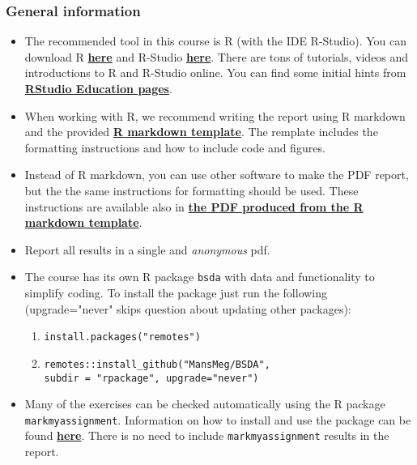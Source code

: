 
\subsubsection*{General information}


\begin{itemize}

\item The recommended tool in this course is R (with the IDE R-Studio). You can download R \href{https://cran.r-project.org/}{\textbf{here}} and R-Studio \href{https://www.rstudio.com/products/rstudio/download/}{\textbf{here}}. There are tons of tutorials, videos and introductions to R and R-Studio online. You can find some initial hints from \href{https://education.rstudio.com/}{\textbf{RStudio Education pages}}.
\item When working with R, we recommend writing the report using R markdown and the provided \href{https://github.com/MansMeg/BSDA/blob/main/templates/assignment_template.rmd}{\textbf{R markdown template}}.
The remplate includes the formatting instructions and how to include code and figures.
\item Instead of R markdown, you can use other software to make the PDF report, but the the same instructions for formatting should be used. These instructions are available also in \href{https://github.com/MansMeg/BSDA/blob/main/templates/assignment_template.pdf}{\textbf{the PDF produced from the R markdown template}}.
\item Report all results in a single and \emph{anonymous} pdf.
\item The course has its own R package \texttt{bsda} with data and functionality to simplify coding. To install the package just run the following (upgrade="never" skips question about updating other packages):
\begin{enumerate}
\item \texttt{install.packages("remotes")}
\item \texttt{remotes::install\_github("MansMeg/BSDA", \\ subdir = "rpackage", upgrade="never")}
\end{enumerate}
\item Many of the exercises can be checked automatically using the R package \\ \texttt{markmyassignment}. Information on how to install and use the package can be found \href{https://cran.r-project.org/web/packages/markmyassignment/vignettes/markmyassignment.html}{\textbf{here}}. There is no need to include \texttt{markmyassignment} results in the report.

\end{itemize}
